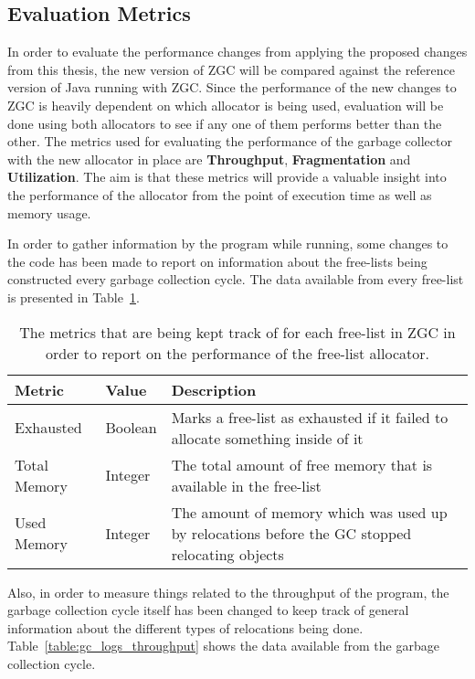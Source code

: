 \subsection{Evaluation Metrics}
In order to evaluate the performance changes from applying the proposed changes from this thesis, the new version of ZGC will be compared against the reference version of Java running with ZGC. Since the performance of the new changes to ZGC is heavily dependent on which allocator is being used, evaluation will be done using both allocators to see if any one of them performs better than the other. The metrics used for evaluating the performance of the garbage collector with the new allocator in place are \textbf{Throughput}, \textbf{Fragmentation} and \textbf{Utilization}. The aim is that these metrics will provide a valuable insight into the performance of the allocator from the point of execution time as well as memory usage.

In order to gather information by the program while running, some changes to the code has been made to report on information about the free-lists being constructed every garbage collection cycle. The data available from every free-list is presented in Table~\ref{table:gc_logs_fl}.

\begin{table}[H]
  \centering
  \begin{tabular}{|l|l|p{8cm}|}
    \hline
    Metric & Value & Description \\ \hline
    Exhausted & Boolean & Marks a free-list as exhausted if it failed to allocate something inside of it \\ \hline
    Total Memory & Integer & The total amount of free memory that is available in the free-list \\ \hline
    Used Memory & Integer & The amount of memory which was used up by relocations before the GC stopped relocating objects \\ \hline
  \end{tabular}
  \caption{The metrics that are being kept track of for each free-list in ZGC in order to report on the performance of the free-list allocator.}
  \label{table:gc_logs_fl}
\end{table}

Also, in order to measure things related to the throughput of the program, the garbage collection cycle itself has been changed to keep track of general information about the different types of relocations being done. Table~\ref{table:gc_logs_throughput} shows the data available from the garbage collection cycle.


